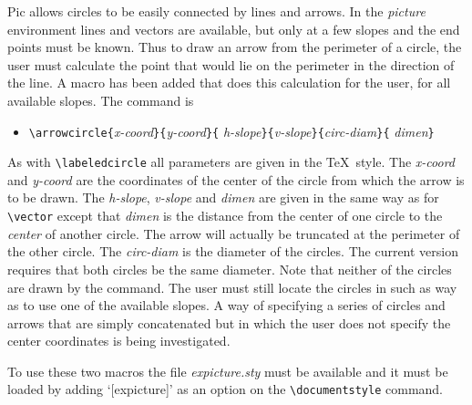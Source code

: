 Pic allows circles to be easily connected by lines and arrows.  In
the {\it picture} environment lines and vectors are available, but
only at a few slopes and the end points must be known.  Thus to draw
an arrow from the perimeter of a circle, the
user must calculate the point that would lie on the perimeter in the
direction of the line.  A macro has been added that does this
calculation for the user, for all available slopes.  The command is
\begin{itemize}
\item[]
\verb|\arrowcircle{|{\it x-coord}\verb|}{|{\it y-coord}\verb|}{|{\it
  h-slope}\verb|}{|{\it v-slope}\verb|}{|{\it circ-diam}\verb|}{|{\it
  dimen}\verb|}|
\end{itemize}
As with \verb|\labeledcircle| all parameters are given in the \TeX\
style.  The {\it x-coord} and {\it y-coord} are the coordinates of
the center of the circle from which the arrow is to be drawn.  The
{\it h-slope}, {\it v-slope} and {\it dimen} are given in the same 
way as for \verb|\vector| except that {\it dimen} is the distance
from the center of one circle to the {\it center} of another circle.  
The arrow will actually be
truncated at the perimeter of the other circle.  The {\it circ-diam} 
is the diameter of the circles.  The current version requires that
both circles be the same diameter.  Note that neither of the circles
are drawn by the command.  The user must still locate the circles in
such as way as to use one of the available slopes.  A way of
specifying a series of circles and arrows that are simply
concatenated but in which the user does not specify the center
coordinates is being investigated.

To use these two macros the file {\it expicture.sty} must be
available and it must be loaded by adding `[expicture]' as an option
on the \verb|\documentstyle| command.
